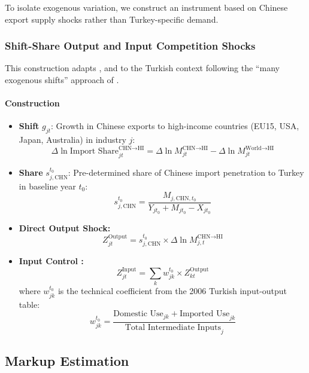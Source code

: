 \documentclass[12pt]{article}
\begin{document}
To isolate exogenous variation, we construct an instrument based on Chinese export supply shocks rather than Turkey-specific demand.

\subsubsection{Shift-Share Output and Input Competition Shocks}

This construction adapts \cite{autorChinaSyndromeLocal2013}, and \cite{aghionOpposingFirmLevelResponses2024} to the Turkish context following the ``many exogenous shifts'' approach of \cite{borusyakQuasiExperimentalShiftShareResearch2022}.

\paragraph{Construction}

\begin{itemize}
    \item \textbf{Shift} $g_{jt}$: Growth in Chinese exports to high-income countries (EU15, USA, Japan, Australia) in industry $j$:
    \[
    \Delta \ln \text{Import Share}_{jt}^{\text{CHN} \to \text{HI}} = \Delta \ln M_{jt}^{\text{CHN} \to \text{HI}} - \Delta \ln M_{jt}^{\text{World} \to \text{HI}}
    \]

    \item \textbf{Share} $s_{j,\text{CHN}}^{t_0}$: Pre-determined share of Chinese import penetration to Turkey in baseline year $t_0$:
    \[
    s_{j,\text{CHN}}^{t_0} = \frac{M_{j,\text{CHN},t_0}}{Y_{jt_0} + M_{jt_0} - X_{jt_0}}
    \]

    \item \textbf{Direct Output Shock:}
    \[
    Z_{jt}^{\text{Output}} = s_{j,\text{CHN}}^{t_0} \times \Delta \ln M_{j,t}^{\text{CHN} \to \text{HI}}
    \]

    \item \textbf{Input Control \parencite{amitiTradeLiberalizationIntermediate2007}:}
    \[
    Z_{jt}^{\text{Input}} = \sum_k w_{jk}^{t_0} \times Z_{kt}^{\text{Output}}
    \]
    where $w_{jk}^{t_0}$ is the technical coefficient from the 2006 Turkish input-output table:
    \[
    w_{jk}^{t_0} = \frac{\text{Domestic Use}_{jk} + \text{Imported Use}_{jk}}{\text{Total Intermediate Inputs}_j}
    \]
\end{itemize}

\subsection{Markup Estimation}
\end{document}

